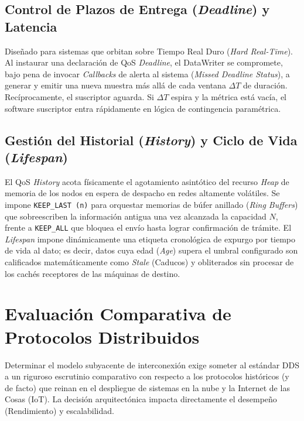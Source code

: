 \documentclass[11pt,a4paper,oneside]{report}
\begin{document}
\subsection{Control de Plazos de Entrega (\textit{Deadline}) y Latencia}
Dise\~nado para sistemas que orbitan sobre Tiempo Real Duro (\textit{Hard Real-Time}). Al instaurar una declaraci\'on de QoS \textit{Deadline}, el DataWriter se compromete, bajo pena de invocar \textit{Callbacks} de alerta al sistema (\textit{Missed Deadline Status}), a generar y emitir una nueva muestra m\'as all\'a de cada ventana $\Delta T$ de duraci\'on. Rec\'iprocamente, el suscriptor aguarda. Si $\Delta T$ espira y la m\'etrica est\'a vac\'ia, el software suscriptor entra r\'apidamente en l\'ogica de contingencia param\'etrica.

\subsection{Gesti\'on del Historial (\textit{History}) y Ciclo de Vida (\textit{Lifespan})}
El QoS \textit{History} acota f\'isicamente el agotamiento asint\'otico del recurso \textit{Heap} de memoria de los nodos en espera de despacho en redes altamente vol\'atiles. Se impone \texttt{KEEP\_LAST (n)} para orquestar memorias de b\'ufer anillado (\textit{Ring Buffers}) que sobreescriben la informaci\'on antigua una vez alcanzada la capacidad $N$, frente a \texttt{KEEP\_ALL} que bloquea el env\'io hasta lograr confirmaci\'on de tr\'amite. El \textit{Lifespan} impone din\'amicamente una etiqueta cronol\'ogica de expurgo por tiempo de vida al dato; es decir, datos cuya edad (\textit{Age}) supera el umbral configurado son calificados matem\'aticamente como \textit{Stale} (Caducos) y obliterados sin procesar de los cach\'es receptores de las m\'aquinas de destino.

\section{Evaluaci\'on Comparativa de Protocolos Distribuidos}

Determinar el modelo subyacente de interconexi\'on exige someter al est\'andar DDS a un riguroso escrutinio comparativo con respecto a los protocolos hist\'oricos (y de facto) que reinan en el despliegue de sistemas en la nube y la Internet de las Cosas (IoT). La decisi\'on arquitect\'onica impacta directamente el desempe\~no (Rendimiento) y escalabilidad.
\end{document}
